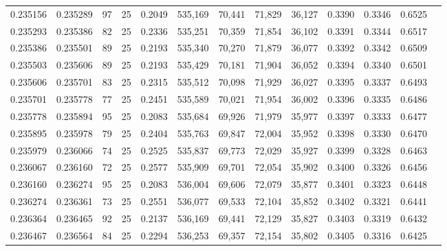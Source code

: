 \begin{tabular}{rrrrrrrrrrrrr}
0.235156 & 0.235289 &    97 &  25 &                                     0.2049 & 535,169 &  70,441 &  71,829 &  36,127 & 0.3390 & 0.3346 & 0.6525 \\
0.235293 & 0.235386 &    82 &  25 &                                     0.2336 & 535,251 &  70,359 &  71,854 &  36,102 & 0.3391 & 0.3344 & 0.6517 \\
0.235386 & 0.235501 &    89 &  25 &                                     0.2193 & 535,340 &  70,270 &  71,879 &  36,077 & 0.3392 & 0.3342 & 0.6509 \\
0.235503 & 0.235606 &    89 &  25 &                                     0.2193 & 535,429 &  70,181 &  71,904 &  36,052 & 0.3394 & 0.3340 & 0.6501 \\
0.235606 & 0.235701 &    83 &  25 &                                     0.2315 & 535,512 &  70,098 &  71,929 &  36,027 & 0.3395 & 0.3337 & 0.6493 \\
0.235701 & 0.235778 &    77 &  25 &                                     0.2451 & 535,589 &  70,021 &  71,954 &  36,002 & 0.3396 & 0.3335 & 0.6486 \\
0.235778 & 0.235894 &    95 &  25 &                                     0.2083 & 535,684 &  69,926 &  71,979 &  35,977 & 0.3397 & 0.3333 & 0.6477 \\
0.235895 & 0.235978 &    79 &  25 &                                     0.2404 & 535,763 &  69,847 &  72,004 &  35,952 & 0.3398 & 0.3330 & 0.6470 \\
0.235979 & 0.236066 &    74 &  25 &                                     0.2525 & 535,837 &  69,773 &  72,029 &  35,927 & 0.3399 & 0.3328 & 0.6463 \\
0.236067 & 0.236160 &    72 &  25 &                                     0.2577 & 535,909 &  69,701 &  72,054 &  35,902 & 0.3400 & 0.3326 & 0.6456 \\
0.236160 & 0.236274 &    95 &  25 &                                     0.2083 & 536,004 &  69,606 &  72,079 &  35,877 & 0.3401 & 0.3323 & 0.6448 \\
0.236274 & 0.236361 &    73 &  25 &                                     0.2551 & 536,077 &  69,533 &  72,104 &  35,852 & 0.3402 & 0.3321 & 0.6441 \\
0.236364 & 0.236465 &    92 &  25 &                                     0.2137 & 536,169 &  69,441 &  72,129 &  35,827 & 0.3403 & 0.3319 & 0.6432 \\
0.236467 & 0.236564 &    84 &  25 &                                     0.2294 & 536,253 &  69,357 &  72,154 &  35,802 & 0.3405 & 0.3316 & 0.6425 \\

\end{tabular}
